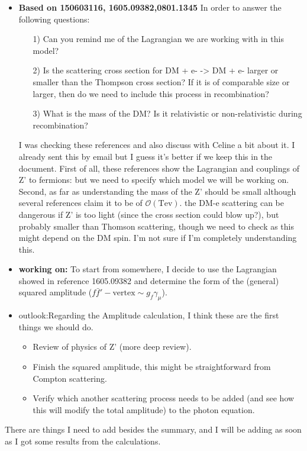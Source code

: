 \documentclass[amssymb,useAMS,prd,aps,amsmath,onecolumn,superscriptaddress,nofootinbib]{revtex4}
\begin{document}
\begin{itemize}
\begin{itemize}
\begin{itemize}
		\end{itemize}
\end{itemize}
\item \textbf{Based on 150603116, 1605.09382,0801.1345} In order to answer the following questions:
	\begin{itemize}
	\item [1)] Can you remind me of the Lagrangian we are working with in this model?
	\item[2)] Is the scattering cross section for DM + e-  ->  DM + e- larger or smaller than the Thompson cross section? If 	it is of comparable size or larger, then do we need to include this process in recombination? 
	\item[3)] What is the mass of the DM? Is it relativistic or non-relativistic during recombination?
	\end{itemize}
I was checking these references and also discuss with Celine a bit about it. I already sent this by email but I guess it's better if we keep this in the document. First of all, these references  show the Lagrangian and couplings of Z' to fermions: but we need to specify which model we will be working on. Second, as far as understanding the  mass of the Z' should be small although several references claim it to be of $\mathcal{O}(\mathrm{Tev})$. the  DM-e scattering can be dangerous if Z' is too light (since the cross section could blow up?), but probably smaller than Thomson scattering, though we need to check as this might depend on the DM spin. I'm not sure if I'm completely understanding this. 
\item \textbf{working on:} To start from somewhere, I decide to use the Lagrangian showed in reference 1605.09382 and determine the form of the (general) squared amplitude ($f\bar{f}'-\mathrm{vertex}\sim g_f\gamma_\mu$). 
\item\textrm{outlook:}Regarding the Amplitude calculation, I think these are the first things we should do.
	\begin{itemize}
	\item Review of physics of Z' (more deep review).
    \item Finish the squared amplitude, this might be  straightforward from Compton scattering.
    \item Verify which another scattering process needs to be added (and see how this will modify the total amplitude)  to the           photon equation.
	\end{itemize}
\end{itemize}
There are things I need to add besides the summary, and I will be adding as soon as I got some results from the calculations.
\end{document}
